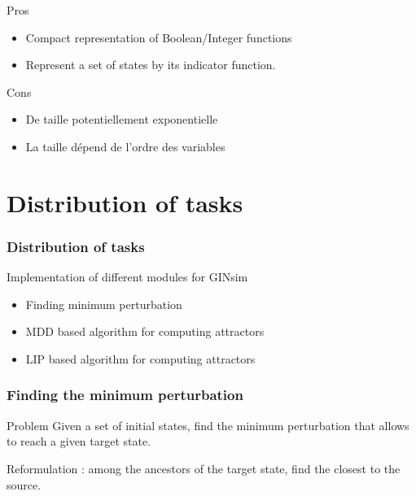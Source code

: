 \documentclass{beamer}
\begin{document}
\begin{frame}

\begin{block}{Pros}
\begin{itemize}
\item Compact representation of Boolean/Integer functions
\item Represent a set of states by its indicator function.
\end{itemize}
\end{block}

\bigskip
\begin{block}{Cons}
\begin{itemize}
\item De taille potentiellement exponentielle
\item La taille dépend de l'ordre des variables
\end{itemize}
\end{block}
\end{frame}


\section{Distribution of tasks}

\begin{frame}
\frametitle{Distribution of tasks} 
Implementation of different modules for GINsim

\begin{itemize}
\item Finding minimum perturbation

\bigskip
\item MDD based algorithm for computing attractors

\bigskip
\item LIP based algorithm for computing attractors
\end{itemize}
  
\end{frame}

\begin{frame}
	\frametitle{Finding the minimum perturbation}
	\begin{block}{Problem}
	Given a set of initial states, find the minimum perturbation that allows to reach a given target state.
	
	Reformulation : among the ancestors of the target state, find the closest to the source.
	\end{block}
\end{frame}
\end{document}
